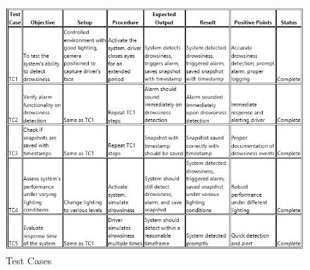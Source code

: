 \documentclass[12pt]{article}
\begin{document}
\begin{figure}[h]
\centering
\includegraphics[width=1.0\textwidth]{tecase}
\caption{Test Cases}
\end{figure}
\FloatBarrier



\newpage
\end{document}

